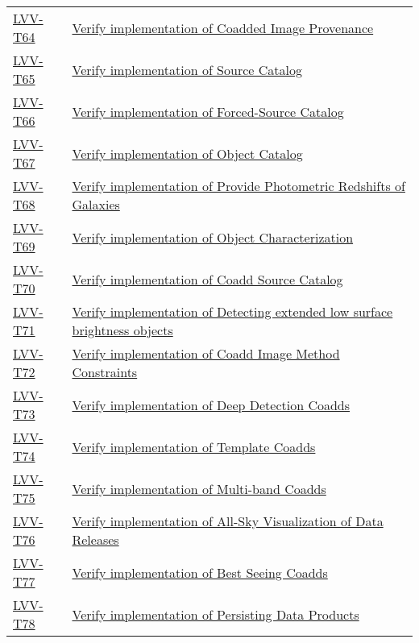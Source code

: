 \begin{longtable}[]{p{3cm}p{13cm}}
    \hyperref[lvv-t64]{LVV-T64} &
    \href{https://jira.lsstcorp.org/secure/Tests.jspa\#/testCase/LVV-T64}{Verify implementation of Coadded Image Provenance} \tabularnewline
    \hyperref[lvv-t65]{LVV-T65} &
    \href{https://jira.lsstcorp.org/secure/Tests.jspa\#/testCase/LVV-T65}{Verify implementation of Source Catalog} \tabularnewline
    \hyperref[lvv-t66]{LVV-T66} &
    \href{https://jira.lsstcorp.org/secure/Tests.jspa\#/testCase/LVV-T66}{Verify implementation of Forced-Source Catalog} \tabularnewline
    \hyperref[lvv-t67]{LVV-T67} &
    \href{https://jira.lsstcorp.org/secure/Tests.jspa\#/testCase/LVV-T67}{Verify implementation of Object Catalog} \tabularnewline
    \hyperref[lvv-t68]{LVV-T68} &
    \href{https://jira.lsstcorp.org/secure/Tests.jspa\#/testCase/LVV-T68}{Verify implementation of Provide Photometric Redshifts of Galaxies} \tabularnewline
    \hyperref[lvv-t69]{LVV-T69} &
    \href{https://jira.lsstcorp.org/secure/Tests.jspa\#/testCase/LVV-T69}{Verify implementation of Object Characterization} \tabularnewline
    \hyperref[lvv-t70]{LVV-T70} &
    \href{https://jira.lsstcorp.org/secure/Tests.jspa\#/testCase/LVV-T70}{Verify implementation of Coadd Source Catalog} \tabularnewline
    \hyperref[lvv-t71]{LVV-T71} &
    \href{https://jira.lsstcorp.org/secure/Tests.jspa\#/testCase/LVV-T71}{Verify implementation of Detecting extended  low surface brightness objects} \tabularnewline
    \hyperref[lvv-t72]{LVV-T72} &
    \href{https://jira.lsstcorp.org/secure/Tests.jspa\#/testCase/LVV-T72}{Verify implementation of Coadd Image Method Constraints} \tabularnewline
    \hyperref[lvv-t73]{LVV-T73} &
    \href{https://jira.lsstcorp.org/secure/Tests.jspa\#/testCase/LVV-T73}{Verify implementation of Deep Detection Coadds} \tabularnewline
    \hyperref[lvv-t74]{LVV-T74} &
    \href{https://jira.lsstcorp.org/secure/Tests.jspa\#/testCase/LVV-T74}{Verify implementation of Template Coadds} \tabularnewline
    \hyperref[lvv-t75]{LVV-T75} &
    \href{https://jira.lsstcorp.org/secure/Tests.jspa\#/testCase/LVV-T75}{Verify implementation of Multi-band Coadds} \tabularnewline
    \hyperref[lvv-t76]{LVV-T76} &
    \href{https://jira.lsstcorp.org/secure/Tests.jspa\#/testCase/LVV-T76}{Verify implementation of All-Sky Visualization of Data Releases} \tabularnewline
    \hyperref[lvv-t77]{LVV-T77} &
    \href{https://jira.lsstcorp.org/secure/Tests.jspa\#/testCase/LVV-T77}{Verify implementation of Best Seeing Coadds} \tabularnewline
    \hyperref[lvv-t78]{LVV-T78} &
    \href{https://jira.lsstcorp.org/secure/Tests.jspa\#/testCase/LVV-T78}{Verify implementation of Persisting Data Products} \tabularnewline

\end{longtable}
